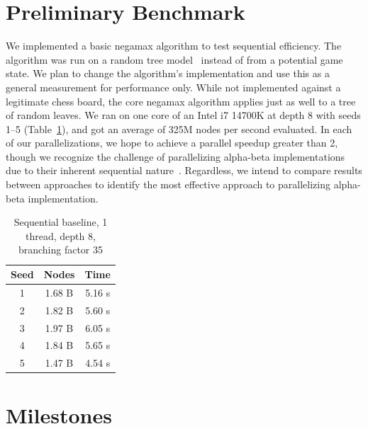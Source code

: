 \documentclass[10pt, conference, compsocconf]{IEEEtran}
\begin{document}
\section{Preliminary Benchmark}

We implemented a basic negamax algorithm to test sequential efficiency. The algorithm was run on a random tree model~\cite{knuth1975, pearl1980} instead of from a potential game state. We plan to change the algorithm's implementation and use this as a general measurement for performance only. While not implemented against a legitimate chess board, the core negamax algorithm applies just as well to a tree of random leaves.
We ran on one core of an Intel i7 14700K at depth 8 with seeds 1--5 (Table~\ref{tab:prelim}), and got an average of 325M nodes per second evaluated. In each of our parallelizations, we hope to achieve a parallel speedup greater than 2, though we recognize the challenge of parallelizing alpha-beta implementations due to their inherent sequential nature~\cite{marsland1982}. Regardless, we intend to compare results between approaches to identify the most effective approach to parallelizing alpha-beta implementation.

\begin{table}[H]
\caption{Sequential baseline, 1 thread, depth 8, branching factor 35}
\label{tab:prelim}
\centering
\begin{tabular}{|c|c|c|}
\hline
Seed & Nodes & Time \\
\hline
1 & 1.68 B & 5.16 s \\
2 & 1.82 B & 5.60 s \\
3 & 1.97 B & 6.05 s \\
4 & 1.84 B & 5.65 s \\
5 & 1.47 B & 4.54 s \\
\hline
\end{tabular}
\end{table}

\section{Milestones}
\end{document}
